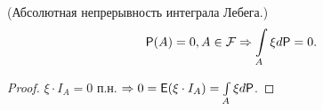 \begin{consequence} (Абсолютная непрерывность интеграла Лебега.)
    $$ \mathsf{P}(A) = 0, A \in \mathcal{F} \Rightarrow \int\limits_{A} \xi d\mathsf{P} = 0. $$
    \begin{proof}
        $\xi \cdot I_A = 0$ п.н. $\Rightarrow 0 = \mathsf{E}(\xi \cdot I_A) = \int\limits_A\xi d\mathsf{P}$.
    \end{proof}
\end{consequence}